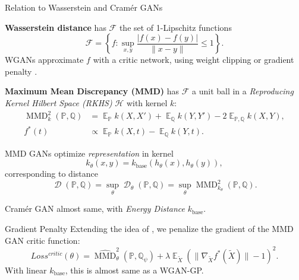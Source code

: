 \documentclass[xcolor={table}]{beamer}
\DeclareMathOperator{\D}{\mathcal{D}}
\DeclareMathOperator*{\E}{\mathbb{E}}
\newcommand{\F}{\mathcal{F}}
\newcommand{\h}{\mathcal{H}}
\newcommand{\PP}{\mathbb P}
\newcommand{\QQ}{\mathbb Q}
\newcommand{\ZZ}{\mathbb Z}
\DeclareMathOperator{\mmd}{MMD}
\begin{document}
\begin{frame}{}
\begin{columns}[T, totalwidth=\textwidth]
\begin{column}{.32\textwidth}
\begin{block}{Relation to Wasserstein and Cram\'er GANs}
      \vspace*{-1.5ex}\begin{itemize}
        \item{\textbf{Wasserstein distance} has $\F$ the set of 1-Lipschitz functions
          \[  
            \F = \left\{f: \sup_{x,y} \frac{|f(x) - f(y)|}{\|x - y\|}\leq 1\right\}. 
          \]
          WGANs approximate $f$ with a critic network,
          using weight clipping \parencite{wgan}
          or gradient penalty \parencite{wgan-gp}.
        \item \textbf{Maximum Mean Discrepancy (MMD)} %
          has $\F$ a unit ball in a 
          \emph{Reproducing Kernel Hilbert Space (RKHS)} $\h$ with kernel $k$:
          \begin{align*}
            \mmd_k^2(\PP, \QQ) &= \E_{\PP} k(X,X') + \E_{\QQ} k(Y,Y') - 2\E_{\PP,\QQ} k(X,Y),\\
            f^*(t) &\propto \E_{\PP}k(X, t) - \E_{\QQ}k(Y, t).
          \end{align*}
        }
        \item
          MMD GANs \parencite{mmd-gan} optimize \emph{representation} in kernel 
          \[ k_{\theta}(x, y) = k_\mathrm{base}(h_{\theta}(x), h_{\theta}(y)), \]
          corresponding to distance
          \[ \D(\PP, \QQ) = {\sup}_\theta \D_\theta(\PP, \QQ) = {\sup}_{\theta} \mmd_{k_\theta}^2(\PP, \QQ). \]
        \item Cram\'er GAN \parencite{cramer-gan} almost same, with \emph{Energy Distance} $k_\mathrm{base}$.
      \end{itemize}
    \end{block}

    \begin{block}{Gradient Penalty}
      Extending the idea of \textcite{wgan-gp}, we penalize the
      gradient of the MMD GAN critic function:
      \[ Loss^{critic}(\theta) = \widehat{\mmd}_{\theta}^2(\PP, \QQ_{\psi}) + \lambda\E_{\tilde{X}}\left(\|\nabla_{\tilde{X}} f^*(\tilde{X})\| - 1\right)^2. \]
      With linear $k_\mathrm{base}$,
      this is almost same as a WGAN-GP.
    \end{block}
  \end{column}


\end{columns}
\end{frame}
\end{document}
